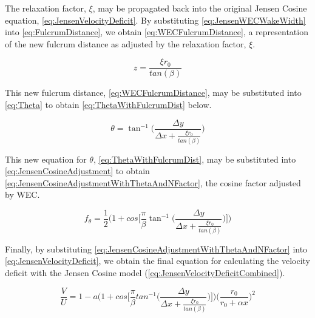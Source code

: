 \documentclass[a4paper]{jpconf}
\begin{document}
The relaxation factor, $\xi$, may be propagated back into the original Jensen Cosine equation, \cref{eq:JensenVelocityDeficit}. By substituting \cref{eq:JensenWECWakeWidth} into \cref{eq:FulcrumDistance}, we obtain \cref{eq:WECFulcrumDistance}, a representation of the new fulcrum distance as adjusted by the relaxation factor, $\xi$.

\begin{equation}
    z = \frac{\xi r_0}{tan(\beta)}
    \label{eq:WECFulcrumDistance}
\end{equation}

This new fulcrum distance, \cref{eq:WECFulcrumDistance}, may be substituted into \cref{eq:Theta} to obtain \cref{eq:ThetaWithFulcrumDist} below.

\begin{equation}
    \theta = \tan^{-1}\Bigg( \frac{\Delta y}{\Delta x + \frac{\xi r_0}{tan(\beta)}} \Bigg)
    \label{eq:ThetaWithFulcrumDist}
\end{equation}

This new equation for $\theta$, \cref{eq:ThetaWithFulcrumDist}, may be substituted into \cref{eq:JensenCosineAdjustment} to obtain \cref{eq:JensenCosineAdjustmentWithThetaAndNFactor}, the cosine factor adjusted by WEC.

\begin{equation}
    f_\theta = \frac{1}{2} \Bigg( 1 + cos \Bigg[ \frac{\pi}{\beta} \tan^{-1}\Bigg( \frac{\Delta y}{\Delta x + \frac{\xi r_0}{tan(\beta)}} \Bigg) \Bigg] \Bigg)
    \label{eq:JensenCosineAdjustmentWithThetaAndNFactor}
\end{equation}

Finally, by substituting \cref{eq:JensenCosineAdjustmentWithThetaAndNFactor} into \cref{eq:JensenVelocityDeficit}, we obtain the final equation for calculating the velocity deficit with the Jensen Cosine model (\cref{eq:JensenVelocityDeficitCombined}).

\begin{equation}
    \frac{V}{U} = 1 - a \Bigg(1 + cos\Bigg[\frac{\pi}{\beta} tan^{-1}\Bigg(\frac{\Delta y}{\Delta x + \frac{\xi r_0}{tan(\beta)}} \Bigg) \Bigg] \Bigg) \bigg(\frac{r_0}{r_0 + \alpha x} \bigg)^2
    \label{eq:JensenVelocityDeficitCombined}
\end{equation}
\end{document}
